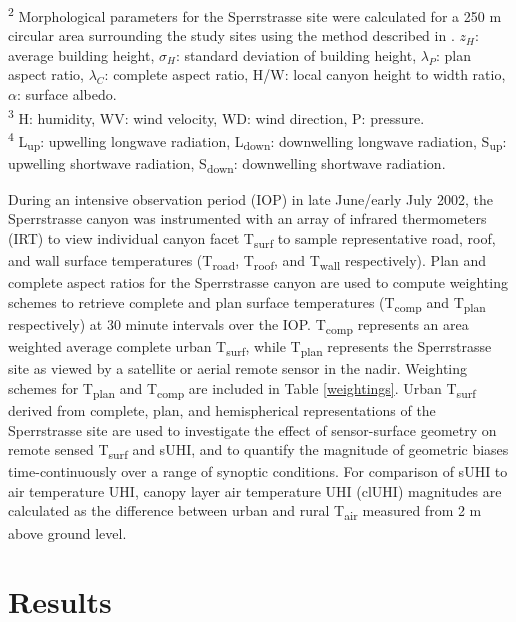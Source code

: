 \begin{table}[H]
\begin{tabular*}{\textwidth}{p{3.75cm} p{2.25cm}p{3.5cm}p{2.75cm}p{2.75cm}}
		\bottomrule
	\end{tabular*} 
		\raggedright
		\textsuperscript{2} Morphological parameters for the Sperrstrasse site were calculated for a 250 \si{\meter} circular area surrounding the study sites using the method described in \citet{Grimmond1999}. $z_H$: average building height, $\sigma_H $: standard deviation of building height, $\lambda_P $: plan aspect ratio, $\lambda_C $: complete aspect ratio, H/W: local canyon height to width ratio, $\alpha$: surface albedo. \\
		\textsuperscript{3} H: humidity, WV: wind velocity, WD: wind direction, P: pressure. \\
		\textsuperscript{4} L\textsubscript{up}: upwelling longwave radiation, L\textsubscript{down}: downwelling longwave radiation, S\textsubscript{up}: upwelling shortwave radiation, S\textsubscript{down}: downwelling shortwave radiation.
\end{table}

During an intensive observation period (IOP) in late June/early July 2002, the Sperrstrasse canyon was instrumented with an array of infrared thermometers (IRT) to view individual canyon facet T\textsubscript{surf} to sample representative road, roof, and wall surface temperatures (T\textsubscript{road}, T\textsubscript{roof}, and T\textsubscript{wall} respectively). Plan and complete aspect ratios for the Sperrstrasse canyon are used to compute weighting schemes to retrieve complete and plan surface temperatures (T\textsubscript{comp} and T\textsubscript{plan} respectively) at 30 minute intervals over the IOP. T\textsubscript{comp} represents an area weighted average complete urban T\textsubscript{surf}, while T\textsubscript{plan} represents the Sperrstrasse site as viewed by a satellite or aerial remote sensor in the nadir. Weighting schemes for T\textsubscript{plan} and T\textsubscript{comp} are included in Table \ref{weightings}. Urban T\textsubscript{surf} derived from complete, plan, and hemispherical representations of the Sperrstrasse site are used to investigate the effect of sensor-surface geometry on remote sensed T\textsubscript{surf} and sUHI, and to quantify the magnitude of geometric biases time-continuously over a range of synoptic conditions. For comparison of sUHI to air temperature UHI, canopy layer air temperature UHI (clUHI) magnitudes are calculated as the difference between urban and rural T\textsubscript{air} measured from 2 \si{\meter} above ground level.

\section{Results}

